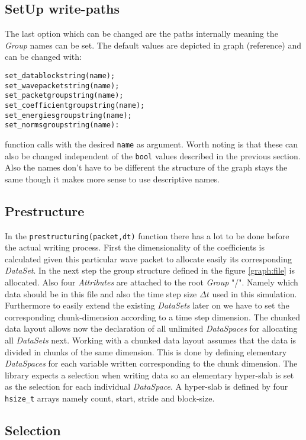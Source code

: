 \documentclass{article}
\begin{document}
\subsection{SetUp write-paths}
The last option which can be changed are the paths internally meaning the \textit{Group} names can be set. The default values are depicted in graph (reference) and can be changed with:
\begin{lstlisting}
set_datablockstring(name);
set_wavepacketstring(name);
set_packetgroupstring(name);
set_coefficientgroupstring(name);
set_energiesgroupstring(name);
set_normsgroupstring(name):
\end{lstlisting}
function calls with the desired \texttt{name} as argument. Worth noting is that these can also be changed independent of the \texttt{bool} values described in the previous section. Also the names don't have to be different the structure of the graph stays the same though it makes more sense to use descriptive names.

\subsection{Prestructure}
In the \texttt{prestructuring(packet,dt)} function there has a lot to be done before the actual writing process. First the dimensionality of the coefficients is calculated given this particular wave packet to allocate easily its corresponding \textit{DataSet}. In the next step the group structure defined in the figure \ref{graph:file} is allocated. Also four \textit{Attributes} are attached to the root \textit{Group} "/". Namely which data should be in this file and also the time step size $\Delta t$ used in this simulation. Furthermore to easily extend the existing \textit{DataSets} later on we have to set the corresponding chunk-dimension according to a time step dimension. The chunked data layout allows now the declaration of all unlimited \textit{DataSpaces} for allocating all \textit{DataSets} next. Working with a chunked data layout assumes that the data is divided in chunks of the same dimension. This is done by defining elementary \textit{DataSpaces} for each variable written corresponding to the chunk dimension. The library expects a selection when writing data so an elementary hyper-slab is set as the selection for each individual \textit{DataSpace}. A hyper-slab is defined by four \texttt{hsize\_t} arrays namely count, start, stride and block-size. 
\subsection{Selection}
\end{document}
